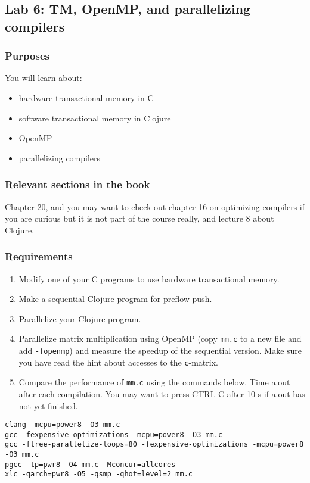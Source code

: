 \documentclass{forsete}
\begin{document}
\subsection*{Lab 6: TM, OpenMP, and parallelizing compilers}
\subsubsection*{Purposes}
You will learn about:
\begin{itemize}
\item hardware transactional memory in C
\item software transactional memory in Clojure
\item OpenMP
\item parallelizing compilers
\end{itemize}

\subsubsection*{Relevant sections in the book}
Chapter 20, and you may want to check out chapter 16 on optimizing compilers if you are curious but it is
not part of the course really, and lecture 8 about Clojure.
\subsubsection*{Requirements}
\begin{enumerate}
\item Modify one of your C programs to use hardware transactional memory.
\item Make a sequential Clojure program for preflow-push.
\item Parallelize your Clojure program.
\item Parallelize matrix multiplication using OpenMP (copy \verb!mm.c! to a new file and add \verb.-fopenmp.) 
and measure the speedup of the sequential version.  Make sure you have read the hint about accesses to the \verb.c.-matrix.
\item Compare the performance of \verb!mm.c! using the commands below.
Time a.out after each compilation. You may want to press CTRL-C after 10 s if
a.out has not yet finished.
\end{enumerate}
\begin{verbatim} 
clang -mcpu=power8 -O3 mm.c
gcc -fexpensive-optimizations -mcpu=power8 -O3 mm.c
gcc -ftree-parallelize-loops=80 -fexpensive-optimizations -mcpu=power8 -O3 mm.c
pgcc -tp=pwr8 -O4 mm.c -Mconcur=allcores
xlc -qarch=pwr8 -O5 -qsmp -qhot=level=2 mm.c
\end{verbatim}
\end{document}
